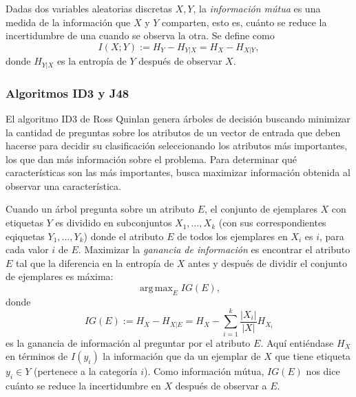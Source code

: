 \documentclass[spanish,11pt,letterpaper]{article}
\DeclareMathOperator*{\argmax}{arg\,max}
\begin{document}
Dadas dos variables aleatorias discretas $X,Y$, la \textit{información mútua} es
una medida de la información que $X$ y $Y$ comparten, esto es, cuánto se reduce
la incertidumbre de una cuando se observa la otra. Se define como
\[I(X;Y) := H_Y-H_{Y|X} = H_X-H_{X|Y},\]
donde $H_{Y|X}$ es la entropía de $Y$ después de observar $X$.

\subsubsection{Algoritmos ID3 y J48}

El algoritmo ID3 de Ross Quinlan genera árboles de decisión buscando minimizar la
cantidad de preguntas sobre los atributos de un vector de entrada que deben hacerse
para decidir su clasificación seleccionando los atributos más importantes,
los que dan más información sobre el problema. Para determinar qué características son
las más importantes, busca maximizar información obtenida al observar una
característica.

Cuando un árbol pregunta sobre un atributo $E$, el conjunto de ejemplares $X$ con
etiquetas $Y$ es dividido en subconjuntos $X_1,\ldots,X_k$ (con sus correspondientes
eqiquetas $Y_1,\ldots,Y_k$) donde el atributo $E$ de todos los ejemplares en $X_i$
es $i$, para cada valor $i$ de $E$. Maximizar la
\textit{ganancia de información} es encontrar el atributo $E$ tal que la diferencia
en la entropía de $X$ antes y después de dividir el conjunto de ejemplares es
máxima:
\[\argmax_E IG(E),\]
donde
\[IG(E) := H_X - H_{X|E} = H_X - \sum_{i=1}^k \frac{|X_i|}{|X|}H_{X_i}\]
es la ganancia de información al preguntar por el atributo $E$. Aquí entiéndase
$H_X$ en términos de $I(y_i)$ la información que da un ejemplar de $X$ que tiene
etiqueta $y_i \in Y$ (pertenece a la categoría $i$). Como
información mútua, $IG(E)$ nos dice cuánto se reduce la incertidumbre en $X$ después
de observar a $E$.
\end{document}
